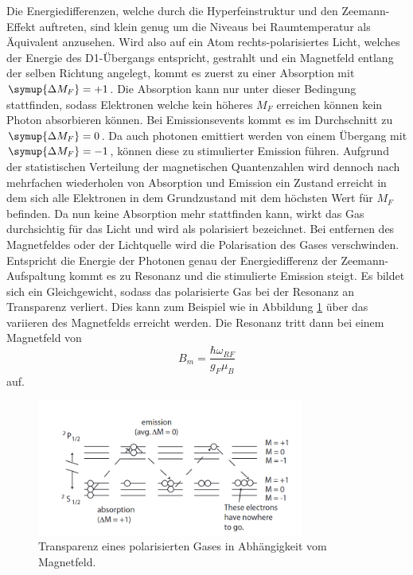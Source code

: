 Die Energiedifferenzen, welche durch die Hyperfeinstruktur und den Zeemann-Effekt auftreten, sind klein genug um die Niveaus bei Raumtemperatur als Äquivalent anzusehen.
Wird also auf ein Atom rechts-polarisiertes Licht, welches der Energie des D1-Übergangs entspricht, gestrahlt und ein Magnetfeld entlang der selben Richtung angelegt, kommt es zuerst zu einer Absorption mit $\symup{\Delta{M_F}} = +1$.
Die Absorption kann nur unter dieser Bedingung stattfinden, sodass Elektronen welche kein höheres $M_F$ erreichen können kein Photon absorbieren können.
Bei Emissionsevents kommt es im Durchschnitt zu $\symup{\Delta{M_F}} = 0$. Da auch photonen emittiert werden von einem Übergang mit $\symup{\Delta{M_F}} = -1$, können diese zu
stimulierter Emission führen. Aufgrund der statistischen Verteilung der magnetischen Quantenzahlen wird dennoch nach mehrfachen wiederholen von Absorption und Emission ein Zustand erreicht
in dem sich alle Elektronen in dem Grundzustand mit dem höchsten Wert für $M_F$ befinden. Da nun keine Absorption mehr stattfinden kann, wirkt das Gas durchsichtig für das Licht und wird als polarisiert bezeichnet.
Bei entfernen des Magnetfeldes oder der Lichtquelle wird die Polarisation des Gases verschwinden. Entspricht die Energie der Photonen genau der Energiedifferenz der Zeemann-Aufspaltung kommt es zu
Resonanz und die stimulierte Emission steigt. Es bildet sich ein Gleichgewicht, sodass das polarisierte Gas bei der Resonanz an Transparenz verliert.
Dies kann zum Beispiel wie in Abbildung \ref{pic:resonanz} über das variieren des Magnetfelds erreicht werden. Die Resonanz tritt dann bei einem Magnetfeld von 
\begin{equation}
    B_m = \frac{\hbar \omega_{RF}}{g_F \mu_B}
\end{equation}
auf.
\begin{figure}
    \centering
    \includegraphics[width = 0.78\textwidth]{pics/pumpen.png}
    \caption{Transparenz eines polarisierten Gases in Abhängigkeit vom Magnetfeld.\cite{V21}}
    \label{pic:resonanz}
\end{figure}



